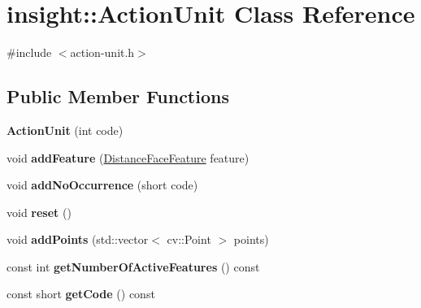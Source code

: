 \hypertarget{classinsight_1_1ActionUnit}{}\section{insight\+:\+:Action\+Unit Class Reference}
\label{classinsight_1_1ActionUnit}


{\ttfamily \#include $<$action-\/unit.\+h$>$}

\subsection*{Public Member Functions}
\begin{DoxyCompactItemize}
\item 
{\bfseries Action\+Unit} (int code)\hypertarget{classinsight_1_1ActionUnit_a0aaad319c79dc0bd53cb0c29fc93a6ee}{}\label{classinsight_1_1ActionUnit_a0aaad319c79dc0bd53cb0c29fc93a6ee}

\item 
void {\bfseries add\+Feature} (\hyperlink{classinsight_1_1DistanceFaceFeature}{Distance\+Face\+Feature} feature)\hypertarget{classinsight_1_1ActionUnit_a14f8f0566680c605da4cf1d624321a01}{}\label{classinsight_1_1ActionUnit_a14f8f0566680c605da4cf1d624321a01}

\item 
void {\bfseries add\+No\+Occurrence} (short code)\hypertarget{classinsight_1_1ActionUnit_ab02cbd2a08378a706eeeda615d91109c}{}\label{classinsight_1_1ActionUnit_ab02cbd2a08378a706eeeda615d91109c}

\item 
void {\bfseries reset} ()\hypertarget{classinsight_1_1ActionUnit_a20df9dc5eaf8c710c482764f2a59d5a4}{}\label{classinsight_1_1ActionUnit_a20df9dc5eaf8c710c482764f2a59d5a4}

\item 
void {\bfseries add\+Points} (std\+::vector$<$ cv\+::\+Point $>$ points)\hypertarget{classinsight_1_1ActionUnit_ad164eb97f7de34641ec861a9d6ac1533}{}\label{classinsight_1_1ActionUnit_ad164eb97f7de34641ec861a9d6ac1533}

\item 
const int {\bfseries get\+Number\+Of\+Active\+Features} () const \hypertarget{classinsight_1_1ActionUnit_ac4a8e2543c842bb9bbd4f7fcb1247e6f}{}\label{classinsight_1_1ActionUnit_ac4a8e2543c842bb9bbd4f7fcb1247e6f}

\item 
const short {\bfseries get\+Code} () const \hypertarget{classinsight_1_1ActionUnit_a98f6eb604d7ed90492a5f24865a73b28}{}\label{classinsight_1_1ActionUnit_a98f6eb604d7ed90492a5f24865a73b28}


\end{DoxyCompactItemize}
